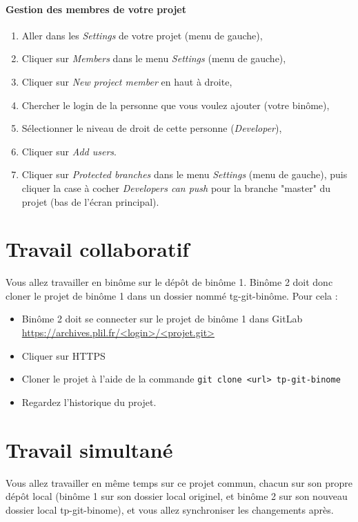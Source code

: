 \documentclass[final, a4paper, openbib, ]{article}
\begin{document}
\paragraph{Gestion des membres de votre projet}
\begin{enumerate}
\item Aller dans les \textit{Settings} de votre projet (menu de gauche),
\item Cliquer sur \textit{Members} dans le menu \textit{Settings} (menu de gauche),
\item Cliquer sur \textit{New project member} en haut à droite,
\item Chercher le login de la personne que vous voulez ajouter (votre binôme),
\item Sélectionner le niveau de droit de cette personne (\textit{Developer}),
\item Cliquer sur \textit{Add users}.
\item Cliquer sur \textit{Protected branches} dans le menu \textit{Settings} (menu de gauche), puis cliquer la case à cocher \textit{Developers can push} pour la branche "master" du projet (bas de l'écran principal).
\end{enumerate}


\section{Travail collaboratif}


Vous allez travailler en binôme sur le dépôt de binôme 1. 
Binôme 2 doit donc cloner le projet de binôme 1 dans un dossier nommé tg-git-binôme.
Pour cela :
\begin{itemize}
\item Binôme 2 doit se connecter sur le projet de binôme 1 dans GitLab \url{https://archives.plil.fr/<login>/<projet.git>}
\item Cliquer sur HTTPS
\item Cloner le projet à l'aide de la commande \texttt{git clone <url> tp-git-binome}
\item Regardez l'historique du projet.
\end{itemize}

\section{Travail simultané}

Vous allez travailler en même temps sur ce projet commun, chacun sur son propre dépôt local (binôme 1 sur son dossier local originel, et binôme 2 sur son nouveau dossier local tp-git-binome), et vous allez synchroniser les changements après.
\end{document}
